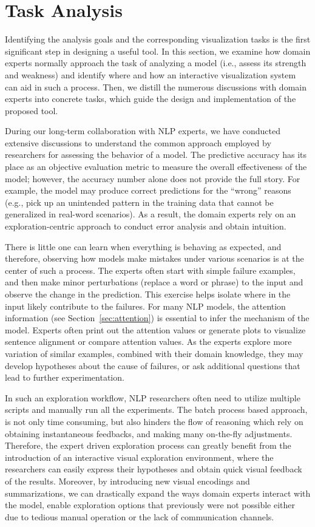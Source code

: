 \section{Task Analysis}
\label{sec:task}
Identifying the analysis goals and the corresponding visualization tasks is the first significant step in designing a useful tool. In this section, we examine how domain experts normally approach the task of analyzing a model (i.e., assess its strength and weakness) and identify where and how an interactive visualization system can aid in such a process.
Then, we distill the numerous discussions with domain experts into concrete tasks, which guide the design and implementation of the proposed tool.

During our long-term collaboration with NLP experts, we have conducted extensive discussions to understand the common approach employed by researchers for assessing the behavior of a model.%
The predictive accuracy has its place as an objective evaluation metric to measure the overall effectiveness of the model; however, the accuracy number alone does not provide the full story.
For example, the model may produce correct predictions for the ``wrong'' reasons (e.g., pick up an unintended pattern in the training data that cannot be generalized in real-word scenarios).
%
As a result, the domain experts rely on an exploration-centric approach to conduct error analysis and obtain intuition.

There is little one can learn when everything is behaving as expected, and therefore,
observing how models make mistakes under various scenarios is at the center of such a process.
The experts often start with simple failure examples, and then make minor perturbations (replace a word or phrase) to the input and observe the change in the prediction. This exercise helps isolate where in the input likely contribute to the failures. For many NLP models, the attention information (see Section~\ref{sec:attention}) is essential to infer the mechanism of the model. Experts often print out the attention values or generate plots to visualize sentence alignment or compare attention values. As the experts explore more variation of similar examples, combined with their domain knowledge, they may develop hypotheses about the cause of failures, or ask additional questions that lead to further experimentation.

In such an exploration workflow, NLP researchers often need to utilize multiple scripts and manually run all the experiments. The batch process based approach, is not only time consuming, but also hinders the flow of reasoning which rely on obtaining instantaneous feedbacks, and making many on-the-fly adjustments.
%
Therefore, the expert driven exploration process can greatly benefit from the introduction of an interactive visual exploration environment, where the researchers can easily express their hypotheses and obtain quick visual feedback of the results.
%
Moreover, by introducing new visual encodings and summarizations, we can drastically expand the ways domain experts interact with the model, enable exploration options that previously were not possible either due to tedious manual operation or the lack of communication channels.

